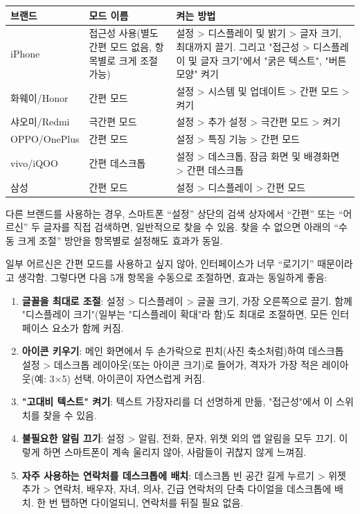 
\begin{center}
\begin{tabularx}{\linewidth}{|X|X|X|}
\hline
\textbf{브랜드} & \textbf{모드 이름} & \textbf{켜는 방법} \tabularnewline
\hline
iPhone & 접근성 사용(별도 간편 모드 없음, 항목별로 크게 조절 가능) & 설정 > 디스플레이 및 밝기 > 글자 크기, 최대까지 끌기. 그리고 "접근성 > 디스플레이 및 글자 크기"에서 "굵은 텍스트", "버튼 모양" 켜기 \tabularnewline
화웨이/Honor & 간편 모드 & 설정 > 시스템 및 업데이트 > 간편 모드 > 켜기 \tabularnewline
샤오미/Redmi & 극간편 모드 & 설정 > 추가 설정 > 극간편 모드 > 켜기 \tabularnewline
OPPO/OnePlus & 간편 모드 & 설정 > 특징 기능 > 간편 모드 \tabularnewline
vivo/iQOO & 간편 데스크톱 & 설정 > 데스크톱, 잠금 화면 및 배경화면 > 간편 데스크톱 \tabularnewline
삼성 & 간편 모드 & 설정 > 디스플레이 > 간편 모드 \tabularnewline
\hline
\end{tabularx}
\end{center}

다른 브랜드를 사용하는 경우, 스마트폰 “설정” 상단의 검색 상자에서 “간편” 또는 “어르신” 두 글자를 직접 검색하면, 일반적으로 찾을 수 있음. 찾을 수 없으면 아래의 “수동 크게 조절” 방안을 항목별로 설정해도 효과가 동일.


일부 어르신은 간편 모드를 사용하고 싶지 않아, 인터페이스가 너무 “로기기” 때문이라고 생각함. 그렇다면 다음 5개 항목을 수동으로 조절하면, 효과는 동일하게 좋음:

\begin{enumerate}
  \item \textbf{글꼴을 최대로 조절}: 설정 > 디스플레이 > 글꼴 크기, 가장 오른쪽으로 끌기. 함께 "디스플레이 크기"(일부는 "디스플레이 확대"라 함)도 최대로 조절하면, 모든 인터페이스 요소가 함께 커짐.
  \item \textbf{아이콘 키우기}: 메인 화면에서 두 손가락으로 핀치(사진 축소처럼)하여 데스크톱 설정 > 데스크톱 레이아웃(또는 아이콘 크기)로 들어가, 격자가 가장 적은 레이아웃(예: 3×5) 선택, 아이콘이 자연스럽게 커짐.
  \item \textbf{"고대비 텍스트" 켜기}: 텍스트 가장자리를 더 선명하게 만듦, "접근성"에서 이 스위치를 찾을 수 있음.
  \item \textbf{불필요한 알림 끄기}: 설정 > 알림, 전화, 문자, 위챗 외의 앱 알림을 모두 끄기. 이렇게 하면 스마트폰이 계속 울리지 않아, 사람들이 귀찮지 않게 느껴짐.
  \item \textbf{자주 사용하는 연락처를 데스크톱에 배치}: 데스크톱 빈 공간 길게 누르기 > 위젯 추가 > 연락처, 배우자, 자녀, 의사, 긴급 연락처의 단축 다이얼을 데스크톱에 배치. 한 번 탭하면 다이얼되니, 연락처를 뒤질 필요 없음.
\end{enumerate}

